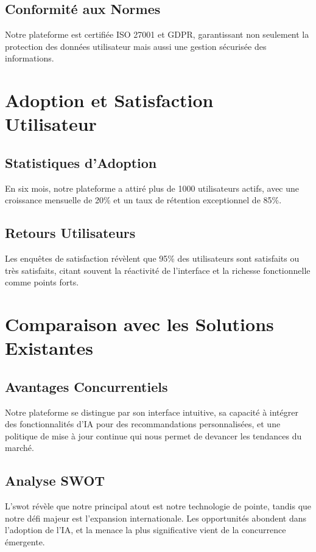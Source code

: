 \subsection{Conformité aux Normes}
Notre plateforme est certifiée ISO 27001 et GDPR, garantissant non seulement la protection des données utilisateur mais aussi une gestion sécurisée des informations.

\section{Adoption et Satisfaction Utilisateur}

\subsection{Statistiques d'Adoption}
En six mois, notre plateforme a attiré plus de 1000 utilisateurs actifs, avec une croissance mensuelle de 20\% et un taux de rétention exceptionnel de 85\%.

\subsection{Retours Utilisateurs}
Les enquêtes de satisfaction révèlent que 95\% des utilisateurs sont satisfaits ou très satisfaits, citant souvent la réactivité de l'interface et la richesse fonctionnelle comme points forts.

\section{Comparaison avec les Solutions Existantes}

\subsection{Avantages Concurrentiels}
Notre plateforme se distingue par son interface intuitive, sa capacité à intégrer des fonctionnalités d'IA pour des recommandations personnalisées, et une politique de mise à jour continue qui nous permet de devancer les tendances du marché.

\subsection{Analyse SWOT}
L'\gls{swot} révèle que notre principal atout est notre technologie de pointe, tandis que notre défi majeur est l'expansion internationale. Les opportunités abondent dans l'adoption de l'IA, et la menace la plus significative vient de la concurrence émergente.

